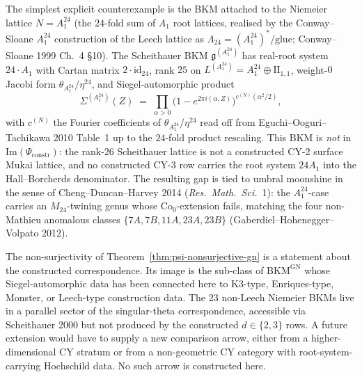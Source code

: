 \begin{remark}
\label{rem:psi-counterexample-A1-24}
The simplest explicit counterexample is the BKM attached to the Niemeier lattice $N = A_1^{24}$ (the $24$-fold sum of $A_1$ root lattices, realised by the Conway--Sloane $A_1^{24}$ construction of the Leech lattice as $\Lambda_{24} = (A_1^{24})^* / \text{glue}$; Conway--Sloane 1999 Ch.~4 \S10). The Scheithauer BKM $\mathfrak{g}^{(A_1^{24})}$ has real-root system $24 \cdot A_1$ with Cartan matrix $2 \cdot \mathrm{id}_{24}$, rank $25$ on $L^{(A_1^{24})} = A_1^{24} \oplus \mathrm{II}_{1,1}$, weight-$0$ Jacobi form $\theta_{A_1^{24}} / \eta^{24}$, and Siegel-automorphic product
\[
 \Sigma^{(A_1^{24})}(Z) \;=\; \prod_{\alpha > 0} \bigl(1 - e^{2\pi i (\alpha, Z)}\bigr)^{c^{(N)}(\alpha^2 / 2)},
\]
with $c^{(N)}$ the Fourier coefficients of $\theta_{A_1^{24}} / \eta^{24}$ read off from Eguchi--Ooguri--Tachikawa 2010 Table~1 up to the $24$-fold product rescaling. This BKM is \emph{not} in $\mathrm{Im}(\Psi_{\mathrm{constr}})$: the rank-$26$ Scheithauer lattice is not a constructed CY-2 surface Mukai lattice, and no constructed CY-3 row carries the root system $24A_1$ into the Hall--Borcherds denominator. The resulting gap is tied to umbral moonshine in the sense of Cheng--Duncan--Harvey 2014 (\emph{Res.\ Math.\ Sci.}~1): the $A_1^{24}$-case carries an $M_{24}$-twining genus whose $\mathrm{Co}_0$-extension fails, matching the four non-Mathieu anomalous classes $\{7A, 7B, 11A, 23A, 23B\}$ (Gaberdiel--Hohenegger--Volpato 2012).
\end{remark}

\begin{remark}
\label{rem:psi-nonsurj-scope}
The non-surjectivity of Theorem~\ref{thm:psi-nonsurjective-gn} is a statement about the constructed correspondence. Its image is the sub-class of $\mathrm{BKM}^{\mathrm{GN}}$ whose Siegel-automorphic data has been connected here to K3-type, Enriques-type, Monster, or Leech-type construction data. The 23 non-Leech Niemeier BKMs live in a parallel sector of the singular-theta correspondence, accessible via Scheithauer 2000 but not produced by the constructed \(d\in\{2,3\}\) rows. A future extension would have to supply a new comparison arrow, either from a higher-dimensional CY stratum or from a non-geometric CY category with root-system-carrying Hochschild data. No such arrow is constructed here.
\end{remark}

